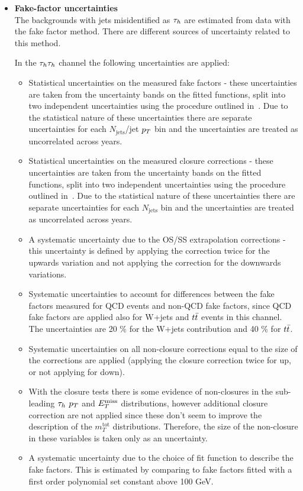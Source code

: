 \begin{itemize}
\item {\bf Fake-factor uncertainties} \\

The backgrounds with jets misidentified as $\tau_{h}$ are estimated from data with the fake factor method. There are
different sources of uncertainty related to this method.

In the $\tau_{h}\tau_{h}$ channel the following uncertainties are applied:
\begin{itemize}
\item Statistical uncertainties on the measured fake factors - these uncertainties are taken from the uncertainty bands on the fitted functions, split into two independent uncertainties using the procedure outlined in~\cite{CPDecayAnalysis}. 
Due to the statistical nature of these uncertainties there are separate uncertainties for each $N_{\text{jets}}$/jet $p_{T}$ bin and the uncertainties are treated as uncorrelated across years.
\item Statistical uncertainties on the measured closure corrections - these uncertainties are taken from the uncertainty bands on the fitted functions, split into two independent uncertainties using the procedure outlined in~\cite{CPDecayAnalysis}. 
Due to the statistical nature of these uncertainties there are separate uncertainties for each $N_{\text{jets}}$ bin and the uncertainties are treated as uncorrelated across years.
\item A systematic uncertainty due to the OS/SS extrapolation corrections
- this uncertainty is defined by applying the correction twice for the upwards variation and not applying the correction for the downwards variations. 
\item Systematic uncertainties to account for differences between the fake factors measured for QCD events and non-QCD fake factors, since QCD fake factors are applied also for W+jets and $t\bar{t}$ events in this channel. The uncertainties are 20 \% for the W+jets contribution and 40 \% for $t\bar{t}$. 
\item Systematic uncertainties on all non-closure corrections equal to the size of the corrections are
applied (applying the closure correction twice for up, or not applying for down).
\item With the closure tests there is some evidence of non-closures in the sub-leading $\tau_{h}$ $p_{T}$ and $E_{T}^{\text{miss}}$ distributions, however additional closure correction are not applied since these don't seem to improve the description of the $m_{T}^{\text{tot}}$ distributions. Therefore, the size of the non-closure in these variables is taken only as an uncertainty.
\item A systematic uncertainty due to the choice of fit function to describe the fake factors. This is estimated by comparing to fake factors fitted with a first order polynomial set constant above 100 GeV.
\end{itemize}


\end{itemize}
